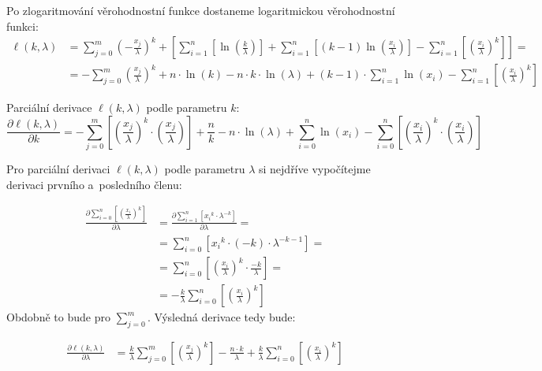 \documentclass[a4paper, 11pt]{article}
\begin{document}
Po zlogaritmování věrohodnostní funkce dostaneme logaritmickou věrohodnostní funkci:
\begin{align*}   
    \ell(k, \lambda) &= \sum_{j=0}^{m}  \left( -\frac{x_j}{\lambda} \right)^k + \left[ \sum_{i=1}^{n} \left[ \ln \left( \frac{k}{\lambda} \right) \right] + \sum_{i=1}^{n} \left[ (k-1) \ln \left( \frac{x_{i}}{\lambda} \right) \right] - \sum_{i=1}^{n} \left[ \left( \frac{x_i}{\lambda} \right)^k \right] \right] = \\
    &= - \sum_{j=0}^{m} \left(\frac{x_j}{\lambda} \right)^k + n \cdot \ln(k) - n \cdot k \cdot \ln(\lambda) + (k-1) \cdot \sum_{i=1}^{n} \ln(x_i) - \sum_{i=1}^{n} \left[ \left( \frac{x_i}{\lambda} \right)^k \right]
\end{align*}

Parciální derivace $\ell(k, \lambda)$ podle parametru $k$:
\[
    \frac{\partial \ell(k, \lambda)}{\partial k} = - \sum_{j=0}^{m} \left[ \left( \frac{x_j}{\lambda} \right)^k \cdot \left( \frac{x_j}{\lambda} \right) \right] + \frac{n}{k} - n \cdot \ln(\lambda) + \sum_{i=0}^{n} \ln(x_i) - \sum_{i=0}^{n} \left[ \left( \frac{x_i}{\lambda} \right)^k \cdot \left( \frac{x_i}{\lambda} \right) \right]
\] 

Pro parciální derivaci $\ell(k, \lambda)$ podle parametru $\lambda$ si nejdříve vypočítejme derivaci prvního a~posledního členu:

\begin{align*}
    \frac{\partial \sum_{i=0}^{n} \left[ \left( \frac{x_i}{\lambda} \right)^k \right] }{\partial \lambda} &= \frac{\partial \sum_{i=1}^{n} \left[ {x_i}^k \cdot \lambda^{-k} \right]}{\partial \lambda} = \\
    &= \sum_{i=0}^{n} \left[ {x_i}^k \cdot (-k) \cdot \lambda^{-k-1} \right] = \\
    &= \sum_{i=0}^{n} \left[ \left( \frac{x_i}{\lambda} \right)^k \cdot \frac{-k}{\lambda} \right] = \\
    &= -\frac{k}{\lambda} \sum_{i=0}^{n} \left[ \left( \frac{x_i}{\lambda} \right)^k \right]
\end{align*}
Obdobně to bude pro $\sum_{j=0}^{m}$.
Výsledná derivace tedy bude:

\begin{align*}
    \frac{\partial \ell(k, \lambda)}{\partial \lambda} &= \frac{k}{\lambda} \sum_{j=0}^{m} \left[ \left( \frac{x_j}{\lambda} \right)^k \right]  -\frac{n \cdot k}{\lambda} + \frac{k}{\lambda} \sum_{i=0}^{n} \left[ \left( \frac{x_i}{\lambda} \right)^k \right]
\end{align*}
\end{document}
